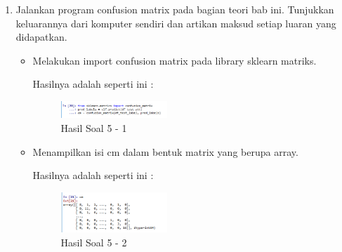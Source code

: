 \begin{enumerate}

\item Jalankan program confusion matrix pada bagian teori bab ini. Tunjukkan keluarannya dari komputer sendiri dan artikan maksud setiap luaran yang didapatkan.
\hfill\break

\begin{itemize}
	\item Melakukan import confusion matrix pada library sklearn matriks.
	
	Hasilnya adalah seperti ini :

	\begin{figure}[H]
	\centering
		\includegraphics[width=4cm]{figures/1174021/tugas3/materi/soal51.PNG}
		\caption{Hasil Soal 5 - 1}
	\end{figure}

	\item Menampilkan isi cm dalam bentuk matrix yang berupa array.
	
	Hasilnya adalah seperti ini :

	\begin{figure}[H]
	\centering
		\includegraphics[width=4cm]{figures/1174021/tugas3/materi/soal52.PNG}
		\caption{Hasil Soal 5 - 2}
	\end{figure}


\end{itemize}
\end{enumerate}
